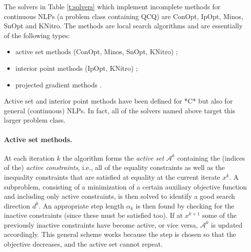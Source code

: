 The solvers in Table \ref{t:solvers} which implement incomplete methods for continuous NLPs (a problem class containing QCQ) are {\sc ConOpt}, {\sc IpOpt}, {\sc Minos}, {\sc SnOpt} and {\sc KNitro}. The methods are local search algorithms and are essentially of the following types: %
\begin{itemize}
 \item active set methods ({\sc ConOpt}, {\sc Minos}, {\sc SnOpt}, {\sc KNitro}) \cite{Dost09};
 \item interior point methods ({\sc IpOpt}, {\sc KNitro}) \cite{Wright97};
 \item projected gradient methods \cite{CalaMore87:mp,ChenGui13:coap}.
\end{itemize}
%
Active set and interior point methods have been defined for *C* but also for general (continuous) NLPs. In fact, all of the solvers named above target this larger problem class.

\paragraph{Active set methods.}
%
At each iteration $k$ the algorithm forms the {\it active set} $\mathcal{A}^k$ containing the (indices of the) {\it active constraints}, i.e., all of the equality constraints as well as the inequality constraints that are satisfied at equality at the current iterate $x^k$. A subproblem, consisting of a minimization of a certain auxiliary objective function and including only active constraints, is then solved to identify a good search direction $d^k$. An appropriate step length $\alpha_k$ is then found by checking for the inactive constraints (since these must be satisfied too). If at $x^{k+1}$ some of the previously inactive constraints have become active, or vice versa, $\mathcal{A}^k$ is updated accordingly. This general scheme works because the step is chosen so that the objective decreases, and the active set cannot repeat. 

